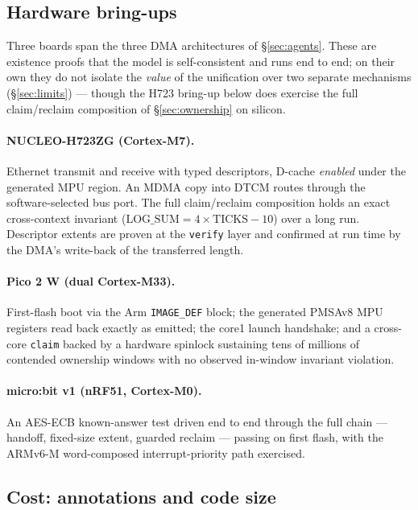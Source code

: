 \documentclass[10pt,twocolumn]{article}
\begin{document}
\subsection{Hardware bring-ups}
\label{sec:eval-boards}

Three boards span the three DMA architectures of \S\ref{sec:agents}. These are
existence proofs that the model is self-consistent and runs end to end; on their
own they do not isolate the \emph{value} of the unification over two separate
mechanisms (\S\ref{sec:limits}) --- though the H723 bring-up below does exercise
the full claim/reclaim composition of \S\ref{sec:ownership} on silicon.

\paragraph{NUCLEO-H723ZG (Cortex-M7).} Ethernet transmit and receive with typed
descriptors, D-cache \emph{enabled} under the generated MPU region. An MDMA copy
into DTCM routes through the software-selected bus port. The full claim/reclaim
composition holds an exact cross-context invariant ($\mathrm{LOG\_SUM} = 4 \times
\mathrm{TICKS} - 10$) over a long run. Descriptor extents are proven at the
\texttt{verify} layer and confirmed at run time by the DMA's write-back of the
transferred length.

\paragraph{Pico 2 W (dual Cortex-M33).} First-flash boot via the Arm
\texttt{IMAGE\_DEF} block; the generated PMSAv8 MPU registers read back exactly
as emitted; the core1 launch handshake; and a cross-core \lstinline!claim!
backed by a hardware spinlock sustaining tens of millions of contended ownership
windows with no observed in-window invariant violation.

\paragraph{micro:bit v1 (nRF51, Cortex-M0).} An AES-ECB known-answer test driven
end to end through the full chain --- handoff, fixed-size extent, guarded reclaim
--- passing on first flash, with the ARMv6-M word-composed interrupt-priority path
exercised.

\subsection{Cost: annotations and code size}
\label{sec:eval-cost}
\end{document}
